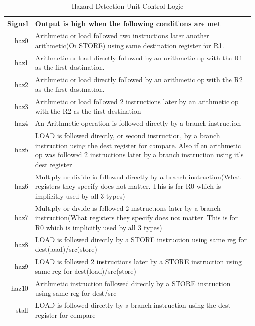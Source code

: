 		\begin{table}[htpb]
		        \caption{Hazard Detection Unit Control Logic}
		        \label{HDU_COND}
		        \centering
		        \begin{tabular}{r | p{7cm}}
		        Signal          & Output is high when the following conditions are met\\
		        \hline
		        \hline
		        haz0			& Arithmetic or load followed two instructions later another arithmetic(Or STORE) using same destination register for R1. \\
		        \hline
		        haz1  			& Arithmetic or load directly followed by an arithmetic op with the R1 as the first destination. \\
		        \hline
		        haz2			& Arithmetic or load directly followed by an arithmetic op with the R2 as the first destination. \\
		        \hline
		        haz3			& Arithmetic or load followed 2 instructions later by an arithmetic op with the R2 as the first destination \\
		        \hline
		        haz4			& An Arithmetic operation is followed directly by a branch instruction   \\
		        \hline
		        haz5			& LOAD is followed directly, or second instruction, by a branch instruction using the dest register for compare. Also if an arithmetic op was followed 2 instructions later by a branch instruction using it's dest register \\
		        \hline
		        haz6			& Multiply or divide is followed directly by a branch instruction(What registers they specify does not matter. This is for R0 which is implicitly used by all 3 types) \\
		        \hline
		        haz7			& Multiply or divide is followed 2 instructions later by a branch instruction(What registers they specify does not matter. This is for R0 which is implicitly used by all 3 types) \\
		        \hline
		        haz8			& LOAD is followed directly by a STORE instruction using same reg for dest(load)/src(store) \\
		        \hline
		        haz9			& LOAD is followed 2 instructions later by a STORE instruction using same reg for 
		        dest(load)/src(store) \\
		        \hline
		        haz10			& Arithmetic instruction followed directly by a STORE instruction using same reg for dest/src \\
		        \hline
		        stall			& LOAD is followed directly by a branch instruction using the dest register for compare \\
		        \end{tabular}
		\end{table}
	\FloatBarrier
